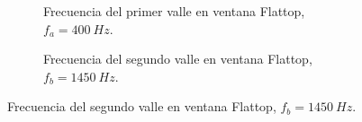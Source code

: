        \begin{figure}[H]
        \centering
        \begin{subfigure}[H]{0.48\textwidth}
          \caption{Frecuencia del primer valle en ventana Flattop, $f_{a}=400~Hz$.}
        \end{subfigure}
        \hfill
        \begin{subfigure}[H]{0.48\textwidth}
          \caption{Frecuencia del segundo valle en ventana Flattop, $f_{b}=1450~Hz$.}
        \end{subfigure}

\end{figure}
